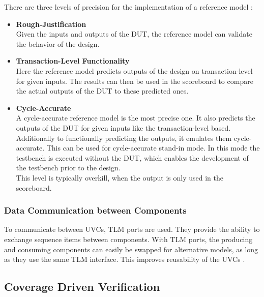 There are three levels of precision for the implementation of a reference model \cite{uvm}:

\begin{itemize}
  \item \textbf{Rough-Justification}\\
  Given the inputs and outputs of the DUT, the reference model can validate the behavior of the design.
  \item \textbf{Transaction-Level Functionality}\\
  Here the reference model predicts outputs of the design on transaction-level for given inputs.
  The results can then be used in the scoreboard to compare the actual outputs of the DUT to these predicted ones. 
  \item \textbf{Cycle-Accurate}\\
  A cycle-accurate reference model is the most precise one. 
  It also predicts the outputs of the DUT for given inputs like the transaction-level based.
  Additionally to functionally predicting the outputs, it emulates them cycle-accurate.
  This can be used for cycle-accurate stand-in mode.
  In this mode the testbench is executed without the DUT, which enables the development of the testbench prior to the design.\\
  This level is typically overkill, when the output is only used in the scoreboard.
\end{itemize}

\subsubsection{Data Communication between Components}\label{tlm}

To communicate between UVCs, TLM ports are used.
They provide the ability to exchange sequence items between components.
With TLM ports, the producing and consuming components can easily be swapped for alternative models, as long as they use the same TLM interface.
This improves reusability of the UVCs \cite{uvm_sv}.

\subsection{Coverage Driven Verification}

